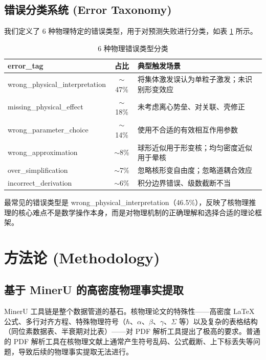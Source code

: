 \documentclass[12pt,a4paper]{article}
\begin{document}
\subsection{错误分类系统 (Error Taxonomy)}

我们定义了 6 种物理特定的错误类型，用于对预测失败进行分类，如表 \ref{tab:error_taxonomy} 所示。

\begin{table}[h]
\centering
\caption{6 种物理错误类型分类}
\label{tab:error_taxonomy}
\begin{tabular}{lcp{6cm}}
\toprule
\textbf{error\_tag} & \textbf{占比} & \textbf{典型触发场景} \\
\midrule
wrong\_physical\_interpretation & $\sim$47\% & 将集体激发误认为单粒子激发；未识别形变效应 \\
missing\_physical\_effect & $\sim$18\% & 未考虑离心势垒、对关联、壳修正 \\
wrong\_parameter\_choice & $\sim$14\% & 使用不合适的有效相互作用参数 \\
wrong\_approximation & $\sim$8\% & 球形近似用于形变核；均匀密度近似用于晕核 \\
over\_simplification & $\sim$7\% & 忽略核形变自由度；忽略道耦合效应 \\
incorrect\_derivation & $\sim$6\% & 积分边界错误、级数截断不当 \\
\bottomrule
\end{tabular}
\end{table}

最常见的错误类型是 wrong\_physical\_interpretation（46.5\%），反映了核物理推理的核心难点不是数学操作本身，而是对物理机制的正确理解和选择合适的理论框架。

\section{方法论 (Methodology)}

\subsection{基于 MinerU 的高密度物理事实提取}

MinerU 工具链是整个数据管道的基石。核物理论文的特殊性——高密度 LaTeX 公式、多行对齐方程、特殊物理符号（$\hbar$、$\alpha$、$\beta$、$\gamma$、$\Sigma$ 等）以及复杂的表格结构（同位素数据表、半衰期对比表）——对 PDF 解析工具提出了极高的要求。普通的 PDF 解析工具在核物理文献上通常产生符号乱码、公式截断、上下标丢失等问题，导致后续的物理事实提取无法进行。
\end{document}
